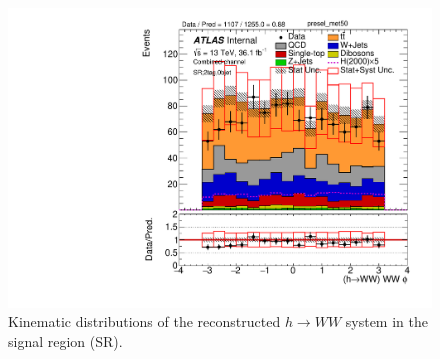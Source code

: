 \begin{figure}[!h]
\begin{center}
\includegraphics[scale=0.33]{./figures/boosted/PlotsInMbbSR/Unblinded/DataMC_2tag_0bjet_SR_lepton_presel_met50_WWPhi}
\caption{Kinematic distributions of the reconstructed $h \to WW$ system in the signal region (SR).}
\label{fig:boosted_SR_wwsystem}
\end{center}
\end{figure}

